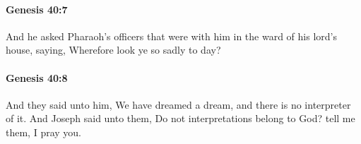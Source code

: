 		\paragraph{Genesis 40:7} %
			\label{GENESIS-40-7}

			And he asked Pharaoh's officers that were with him in the ward of his lord's house, saying, Wherefore look ye so sadly to day?


		\paragraph{Genesis 40:8} %
			\label{GENESIS-40-8}

			And they said unto him, We have dreamed a dream, and there is no interpreter of it. And Joseph said unto them, Do not interpretations belong to God? tell me them, I pray you.


